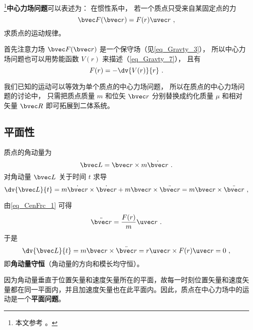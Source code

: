 
\footnote{本文参考 \cite{Goldstein}。}\textbf{中心力场问题}可以表述为： 在惯性系中， 若一个质点只受来自某固定点的力
\begin{equation}\label{eq_CenFrc_1}
\bvec F(\bvec r) = F(r) \uvec r~,
\end{equation}
求质点的运动规律。

首先注意力场 $\bvec F(\bvec r)$ 是一个保守场（见\autoref{eq_Gravty_3}）， 所以中心力场问题也可以用势能函数 $V(r)$ 来描述（\autoref{eq_Gravty_7}）， 且有
\begin{equation}
F(r) = -\dv{V(r)}{r}~.
\end{equation}

我们已知的运动可以等效为单个质点的中心力场问题， 所以在质点的中心力场问题的讨论中， 只需把质点质量 $m$ 和位矢 $\bvec r$ 分别替换成约化质量 $\mu$ 和相对矢量 $\bvec R$ 即可拓展到二体系统。

\subsection{平面性}
质点的角动量为
\begin{equation}
\bvec L =\bvec r \times m \dot{\bvec r}~.
\end{equation}
对角动量 $\bvec L$ 关于时间 $t$ 求导
\begin{equation}
\dv{\bvec L}{t} =m \dot{\bvec r} \times \dot{\bvec r} +m \bvec r \times \ddot{\bvec r}=m \bvec r \times \ddot{\bvec r}~,
\end{equation}

由\autoref{eq_CenFrc_1} 可得
\begin{equation}
\ddot{\bvec r} = \frac{F(r)}{m}\uvec r~.
\end{equation}
于是
\begin{equation}
\dv{\bvec L}{t} =m \bvec r \times \ddot{\bvec r}= r \uvec r \times F(r)\uvec r=0~,
\end{equation}
即\textbf{角动量守恒}（角动量的方向和模长均守恒）。

因为角动量垂直于位置矢量和速度矢量所在的平面，故每一时刻位置矢量和速度矢量都在同一平面内，并且加速度矢量也在此平面内。因此，质点在中心力场中的运动是一个\textbf{平面问题}。

